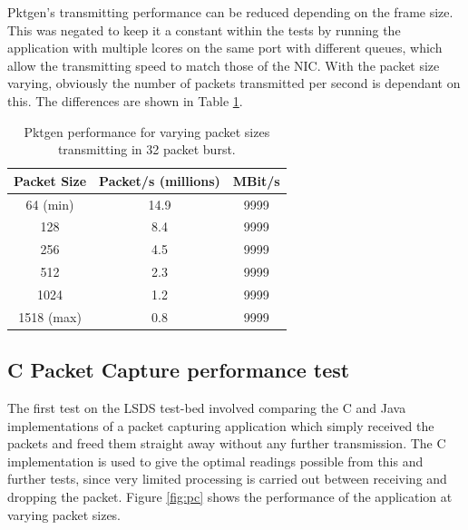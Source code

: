 \documentclass[final_report.tex]{subfiles}
\begin{document}
Pktgen's transmitting performance can be reduced depending on the frame size. This was negated to keep it a constant within the tests by running the application with multiple lcores on the same port with different queues, which allow the transmitting speed to match those of the NIC. With the packet size varying, obviously the number of packets transmitted per second is dependant on this. The differences are shown in Table \ref{tab:pktgen}.

\begin{table}[H]
	\centering
	\begin{tabular} { | c | c | c | }
		\hline
		\textbf{Packet Size} & \textbf{Packet/s (millions)} & \textbf{MBit/s} \\
		\hline
		64 (min) & 14.9 & 9999 \\
		\hline
		128 & 8.4 & 9999 \\
		\hline
		256 & 4.5 & 9999 \\
		\hline
		512 & 2.3 & 9999 \\
		\hline
		1024 & 1.2 & 9999 \\
		\hline
		1518 (max) & 0.8 & 9999 \\
		\hline
	\end{tabular}
	\caption{Pktgen performance for varying packet sizes transmitting in 32 packet burst.}
	\label{tab:pktgen}
\end{table}

\subsection{C Packet Capture performance test}
The first test on the LSDS test-bed involved comparing the C and Java implementations of a packet capturing application which simply received the packets and freed them straight away without any further transmission. The C implementation is used to give the optimal readings possible from this and further tests, since very limited processing is carried out between receiving and dropping the packet. Figure \ref{fig:pc} shows the performance of the application at varying packet sizes.
\end{document}
